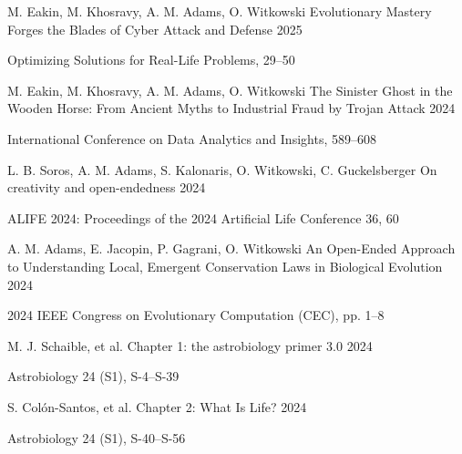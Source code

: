 \begin{cventries}
\cventry
    {M. Eakin, M. Khosravy, \textcolor{cmyk-magenta}{A. M. Adams}, O. Witkowski}
    {Evolutionary Mastery Forges the Blades of Cyber Attack and Defense}
    {}
    {2025}
    {
    \begin{cvitems}
        \item {Optimizing Solutions for Real-Life Problems, 29--50}
    \end{cvitems}
    }

\cventry
    {M. Eakin, M. Khosravy, \textcolor{cmyk-magenta}{A. M. Adams}, O. Witkowski}
    {The Sinister Ghost in the Wooden Horse: From Ancient Myths to Industrial Fraud by Trojan Attack}
    {}
    {2024}
    {
    \begin{cvitems}
        \item {International Conference on Data Analytics and Insights, 589--608}
    \end{cvitems}
    }

\cventry
    {L. B. Soros, \textcolor{cmyk-magenta}{A. M. Adams}, S. Kalonaris, O. Witkowski, C. Guckelsberger}
    {On creativity and open-endedness}
    {}
    {2024}
    {
    \begin{cvitems}
        \item {ALIFE 2024: Proceedings of the 2024 Artificial Life Conference 36, 60}
    \end{cvitems}
    }

\cventry
    {\textcolor{cmyk-magenta}{A. M. Adams}, E. Jacopin, P. Gagrani, O. Witkowski}
    {An Open-Ended Approach to Understanding Local, Emergent Conservation Laws in Biological Evolution}
    {}
    {2024}
    {
    \begin{cvitems}
        \item {2024 IEEE Congress on Evolutionary Computation (CEC), pp. 1–8}
    \end{cvitems}
    }

\cventry
    {M. J. Schaible, et al.}
    {Chapter 1: the astrobiology primer 3.0}
    {}
    {2024}
    {
    \begin{cvitems}
        \item {Astrobiology 24 (S1), S-4–S-39}
    \end{cvitems}
    }

\cventry
    {S. Colón-Santos, et al.}
    {Chapter 2: What Is Life?}
    {}
    {2024}
    {
    \begin{cvitems}
        \item {Astrobiology 24 (S1), S-40–S-56}
    \end{cvitems}
    }


\end{cventries}
